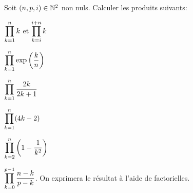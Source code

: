 \documentclass[a4paper, 11pt,reqno]{article}
\begin{document}
\begin{exercice}  \; 
Soit $(n,p,i)\in\mathbb{N}^2$ non nuls. Calculer les produits suivants:
\begin{enumerate}
\begin{minipage}[t]{0.3\textwidth}
\item $\displaystyle \prod\limits_{k=1}^n k$ \; et \; $\displaystyle \prod\limits_{k=i}^{i+n} k$
\item $\displaystyle \prod\limits_{k=1}^n \exp{\left(\displaystyle\frac{k}{n}\right)}$ 
\item $\displaystyle \prod\limits_{k=1}^n \frac{2k}{2k+1}$ 
\end{minipage}
\begin{minipage}[t]{0.6\textwidth}
\item $\displaystyle \prod\limits_{k=1}^n (4k-2)$ 
\item $\displaystyle \prod\limits_{k=2}^n \left(  1-\displaystyle\frac{1}{k^2} \right)$
\item $\displaystyle \prod\limits_{k=0}^{p-1} \displaystyle\frac{n-k}{p-k}$. On exprimera le r\'esultat \`{a} l'aide de factorielles.
\end{minipage}
\end{enumerate}
\end{exercice}
\end{document}
